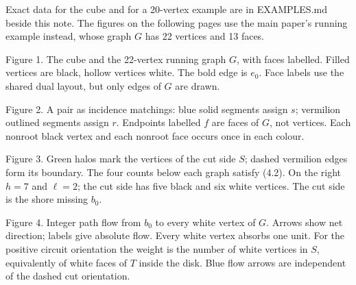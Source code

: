 \documentclass[a4paper,11pt]{amsart}
\begin{document}
Exact data for the cube and for a 20-vertex example are in EXAMPLES.md beside this note. The figures on the following pages use the main paper's running example instead, whose graph $G$ has 22 vertices and 13 faces.
\clearpage
\begin{center}\begin{minipage}{\textwidth}\centering

\par\smallskip\raggedright\footnotesize Figure 1. The cube and the 22-vertex running graph $G$, with faces labelled. Filled vertices are black, hollow vertices white. The bold edge is $e_0$. Face labels use the shared dual layout, but only edges of $G$ are drawn.
\end{minipage}\end{center}\vspace{5mm}
\begin{center}\begin{minipage}{\textwidth}\centering

\par\smallskip\raggedright\footnotesize Figure 2. A pair as incidence matchings: blue solid segments assign $s$; vermilion outlined segments assign $r$. Endpoints labelled $f$ are faces of $G$, not vertices. Each nonroot black vertex and each nonroot face occurs once in each colour.
\end{minipage}\end{center}\vspace{5mm}
\clearpage
\begin{center}\begin{minipage}{\textwidth}\centering

\par\smallskip\raggedright\footnotesize Figure 3. Green halos mark the vertices of the cut side $S$; dashed vermilion edges form its boundary. The four counts below each graph satisfy (4.2). On the right $h=7$ and $\ell=2$; the cut side has five black and six white vertices. The cut side is the shore missing $b_0$.
\end{minipage}\end{center}\vspace{5mm}
\begin{center}\begin{minipage}{\textwidth}\centering

\par\smallskip\raggedright\footnotesize Figure 4. Integer path flow from $b_0$ to every white vertex of $G$. Arrows show net direction; labels give absolute flow. Every white vertex absorbs one unit. For the positive circuit orientation the weight is the number of white vertices in $S$, equivalently of white faces of $T$ inside the disk. Blue flow arrows are independent of the dashed cut orientation.
\end{minipage}\end{center}\vspace{5mm}
\end{document}
